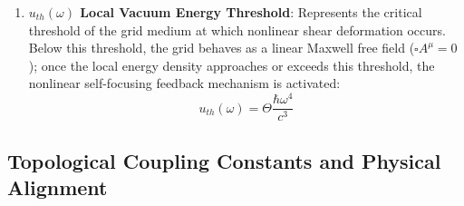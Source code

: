 \documentclass[12pt, a4paper]{article}
\begin{document}
\begin{enumerate}
    \item \textbf{$u_{th}(\omega)$ Local Vacuum Energy Threshold}:  
    Represents the critical threshold of the grid medium at which nonlinear shear deformation occurs. Below this threshold, the grid behaves as a linear Maxwell free field ($\square A^\mu = 0$); once the local energy density approaches or exceeds this threshold, the nonlinear self-focusing feedback mechanism is activated:
    \begin{equation}
    u_{th}(\omega) = \Theta \frac{\hbar\omega^4}{c^3} \label{eq:u_th}
    \end{equation}
\end{enumerate}

\subsection{Topological Coupling Constants and Physical Alignment}
\end{document}
